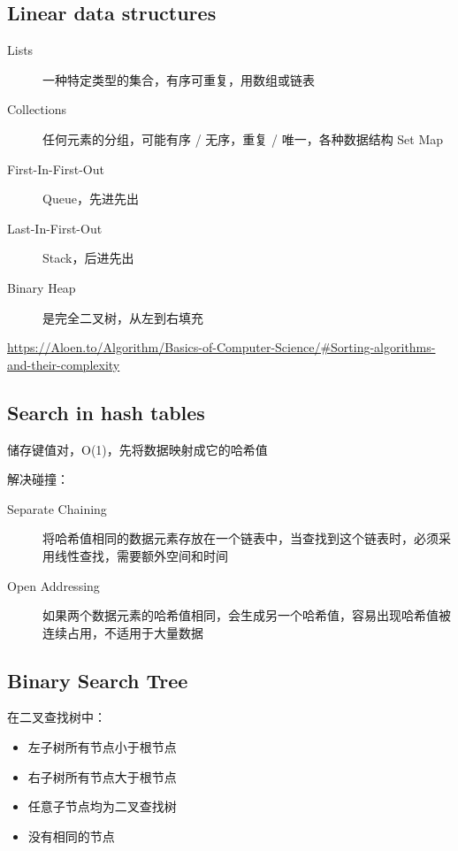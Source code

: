 \documentclass[11pt,journal,compsoc]{IEEEtran}
\begin{document}
\subsection{Linear data structures}

\begin{description}
    \item[Lists] 一种特定类型的集合，有序可重复，用数组或链表

    \item[Collections] 任何元素的分组，可能有序 / 无序，重复 / 唯一，各种数据结构 Set Map
    
    \item[First-In-First-Out] Queue，先进先出
    
    \item[Last-In-First-Out] Stack，后进先出
    
    \item[Binary Heap] 是完全二叉树，从左到右填充
\end{description}

\url{https://Aloen.to/Algorithm/Basics-of-Computer-Science/#Sorting-algorithms-and-their-complexity}


\subsection{Search in hash tables}

储存键值对，O(1)，先将数据映射成它的哈希值

解决碰撞：

\begin{description}
    \item[Separate Chaining] 将哈希值相同的数据元素存放在一个链表中，当查找到这个链表时，必须采用线性查找，需要额外空间和时间

    \item[Open Addressing] 如果两个数据元素的哈希值相同，会生成另一个哈希值，容易出现哈希值被连续占用，不适用于大量数据
\end{description}


\subsection{Binary Search Tree}

在二叉查找树中：

\begin{itemize}
    \item 左子树所有节点小于根节点

    \item 右子树所有节点大于根节点

    \item 任意子节点均为二叉查找树

    \item 没有相同的节点
\end{itemize}
\end{document}
